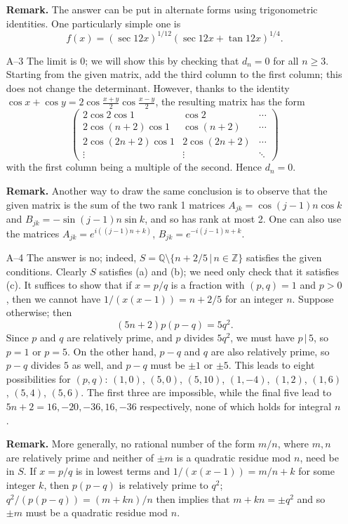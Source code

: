 \documentclass[amssymb,twocolumn,pra,10pt,aps]{revtex4-1}
\begin{document}
\begin{itemize}
\textbf{Remark.} The answer can be put in alternate forms using
trigonometric identities. One particularly simple one is
\[
 f(x) = (\sec 12x)^{1/12} (\sec 12x + \tan 12x)^{1/4}.
\]

\item[A--3]
The limit is $0$; we will show this by checking that $d_n = 0$ for all $n \geq 3$.
Starting from the given matrix, add the third column to the first column; this does not change the
determinant. However, thanks to the identity
$\cos x + \cos y = 2 \cos \frac{x+y}{2} \cos \frac{x-y}{2}$,
the resulting matrix has the form
\[
 \begin{pmatrix} 2 \cos 2 \cos 1 & \cos 2 & \cdots \\
  2 \cos (n+2) \cos 1 & \cos (n+2) & \cdots \\
  2 \cos (2n+2) \cos 1 & 2 \cos (2n+2) & \cdots \\
\vdots & \vdots & \ddots
 \end{pmatrix}
\]
with the first column being a multiple of the second. Hence $d_n = 0$.

\textbf{Remark.}
Another way to draw the same conclusion is to observe that the given matrix is the sum
of the two rank 1 matrices $A_{jk} = \cos (j-1)n \cos k$ and $B_{jk} = -\sin (j-1)n \sin k$,
and so has rank at most 2. One can also use the matrices
$A_{jk} = e^{i((j-1)n+k)}$, $B_{jk} = e^{-i(j-1)n+k}$.

\item[A--4]
The answer is no; indeed, $S = \mathbb{Q} \setminus \{n+2/5 \,|\,
n\in\mathbb{Z}\}$ satisfies the given conditions. Clearly $S$ satisfies
(a) and (b); we need only check that it satisfies (c). It suffices to
show that if $x = p/q$ is a fraction with $(p,q)=1$ and $p>0$, then we
cannot have $1/(x(x-1)) = n+2/5$ for an integer $n$. Suppose otherwise; then
\[
(5n+2)p(p-q) = 5q^2.
\]
Since $p$ and $q$ are relatively prime, and $p$ divides $5q^2$, we must
have $p\,|\,5$, so $p=1$ or $p=5$. On the other hand, $p-q$ and $q$ are
also relatively prime, so $p-q$ divides $5$ as well, and $p-q$ must be
$\pm 1$ or $\pm 5$. This leads to eight possibilities for $(p,q)$:
$(1,0)$,  $(5,0)$,  $(5,10)$, $(1,-4)$, $(1,2)$, $(1,6)$, $(5,4)$,
$(5,6)$. The first three are impossible, while the final five lead to
$5n+2 = 16,-20,-36,16,-36$ respectively, none of which holds for
integral $n$.

\textbf{Remark.} More generally, no rational number of the form $m/n$,
where $m,n$ are relatively prime and neither of $\pm m$ is a quadratic
residue mod $n$, need be in $S$. If $x=p/q$ is in lowest terms and
$1/(x(x-1)) = m/n+k$ for some integer $k$, then $p(p-q)$ is relatively
prime to $q^2$; $q^2/(p(p-q)) = (m+kn)/n$ then implies that $m+kn = \pm
q^2$ and so $\pm m$ must be a quadratic residue mod $n$.


\end{itemize}
\end{document}
